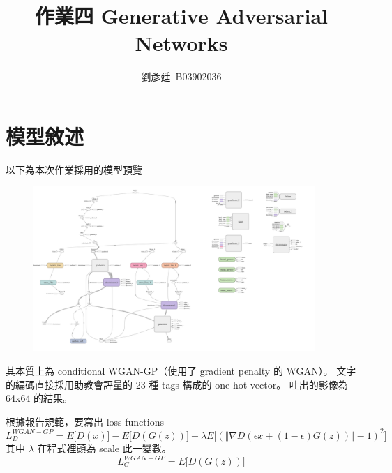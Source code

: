 \documentclass[final,3p]{elsarticle}
\begin{document}
\begin{frontmatter}

\title{作業四 Generative Adversarial Networks}

\author{劉彥廷~B03902036}

\end{frontmatter}


\section{模型敘述}
	以下為本次作業採用的模型預覽
	\begin{figure}[H]
		\centering
		\includegraphics[width=0.95\textwidth]{images/model}
		\label{fig:model}
	\end{figure}
	其本質上為 conditional WGAN-GP（使用了 gradient penalty 的 WGAN）。
	文字的編碼直接採用助教會評量的 23 種 tags 構成的 one-hot vector。
	吐出的影像為 64x64 的結果。
	
	根據報告規範，要寫出 loss functions
	\begin{equation*}
		L^{WGAN-GP}_{D} = E \lbrack D(x) \rbrack - E \lbrack D(G(z)) \rbrack - \lambda E \lbrack ( \Vert \nabla D(\epsilon x + (1-\epsilon) G(z) )\Vert -1)^2 \rbrack
	\end{equation*}
	其中 $\lambda$ 在程式裡頭為 scale 此一變數。
	\begin{equation*}
		L^{WGAN-GP}_{G} = E \lbrack D(G(z)) \rbrack
	\end{equation*}
	
\end{document}
